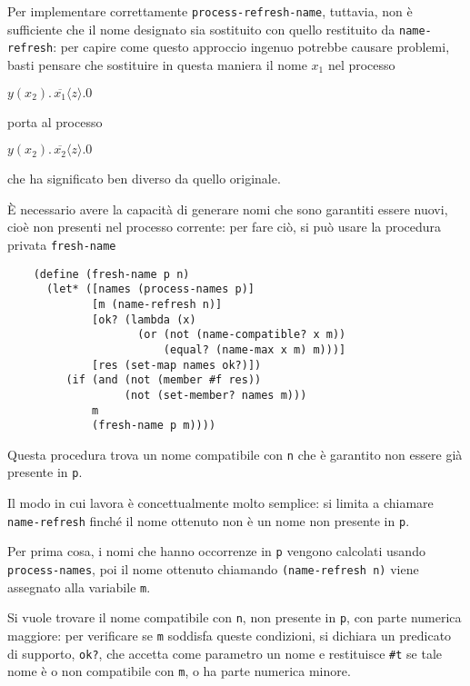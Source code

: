 Per implementare correttamente \lstinline{process-refresh-name}, tuttavia,
non \`e sufficiente che il nome designato sia sostituito con quello
restituito da \lstinline{name-refresh}: per capire come questo approccio
ingenuo potrebbe causare problemi, basti pensare che sostituire in questa
maniera il nome $x_1$ nel processo

\begin{pilisting}
$
    y(x_2) . \, \overline{x_1}\langle z\rangle . 0
$
\end{pilisting}

porta al processo

\begin{pilisting}
$
    y(x_2) . \, \overline{x_2}\langle z\rangle . 0
$
\end{pilisting}

che ha significato ben diverso da quello originale.

\`E necessario avere la capacit\`a di generare nomi che sono garantiti
essere nuovi, cio\`e non presenti nel processo corrente: per fare ci\`o, si
pu\`o usare la procedura privata \lstinline{fresh-name}

\begin{lstlisting}
    (define (fresh-name p n)
      (let* ([names (process-names p)]
             [m (name-refresh n)]
             [ok? (lambda (x)
                    (or (not (name-compatible? x m))
                        (equal? (name-max x m) m)))]
             [res (set-map names ok?)])
         (if (and (not (member #f res))
                  (not (set-member? names m)))
             m
             (fresh-name p m))))
\end{lstlisting}

Questa procedura trova un nome compatibile con \lstinline{n} che \`e
garantito non essere gi\`a presente in \lstinline{p}.

Il modo in cui lavora \`e concettualmente molto semplice: si limita a
chiamare \lstinline{name-refresh} finch\'e il nome ottenuto non \`e
un nome non presente in \lstinline{p}.

Per prima cosa, i nomi che hanno occorrenze in \lstinline{p} vengono
calcolati usando \lstinline{process-names}, poi il nome ottenuto chiamando
\lstinline{(name-refresh n)} viene assegnato alla variabile \lstinline{m}.

Si vuole trovare il nome compatibile con \lstinline{n}, non presente in
\lstinline{p}, con parte numerica maggiore: per verificare se
\lstinline{m} soddisfa queste condizioni, si dichiara un predicato di
supporto, \lstinline{ok?}, che accetta come parametro un nome e restituisce
\lstinline{#t} se tale nome \`e o non compatibile con \lstinline{m}, o ha
parte numerica minore.

